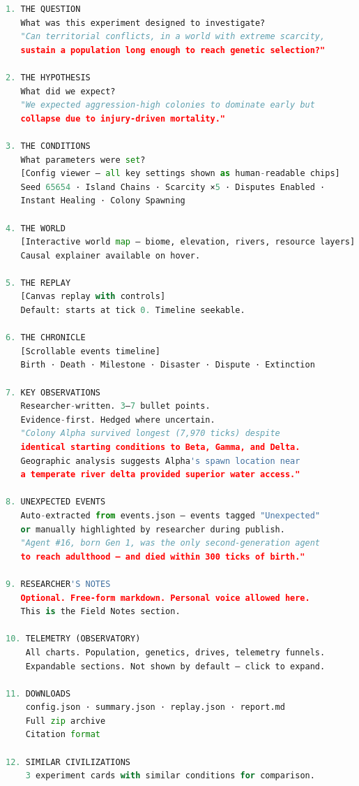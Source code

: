 \documentclass[11pt,a4paper]{article}
\begin{document}
\begin{lstlisting}[language=Python]
1. THE QUESTION
   What was this experiment designed to investigate?
   "Can territorial conflicts, in a world with extreme scarcity,
   sustain a population long enough to reach genetic selection?"

2. THE HYPOTHESIS
   What did we expect?
   "We expected aggression-high colonies to dominate early but
   collapse due to injury-driven mortality."

3. THE CONDITIONS
   What parameters were set?
   [Config viewer — all key settings shown as human-readable chips]
   Seed 65654 · Island Chains · Scarcity ×5 · Disputes Enabled ·
   Instant Healing · Colony Spawning

4. THE WORLD
   [Interactive world map — biome, elevation, rivers, resource layers]
   Causal explainer available on hover.

5. THE REPLAY
   [Canvas replay with controls]
   Default: starts at tick 0. Timeline seekable.

6. THE CHRONICLE
   [Scrollable events timeline]
   Birth · Death · Milestone · Disaster · Dispute · Extinction

7. KEY OBSERVATIONS
   Researcher-written. 3–7 bullet points.
   Evidence-first. Hedged where uncertain.
   "Colony Alpha survived longest (7,970 ticks) despite
   identical starting conditions to Beta, Gamma, and Delta.
   Geographic analysis suggests Alpha's spawn location near
   a temperate river delta provided superior water access."

8. UNEXPECTED EVENTS
   Auto-extracted from events.json — events tagged "Unexpected"
   or manually highlighted by researcher during publish.
   "Agent #16, born Gen 1, was the only second-generation agent
   to reach adulthood — and died within 300 ticks of birth."

9. RESEARCHER'S NOTES
   Optional. Free-form markdown. Personal voice allowed here.
   This is the Field Notes section.

10. TELEMETRY (OBSERVATORY)
    All charts. Population, genetics, drives, telemetry funnels.
    Expandable sections. Not shown by default — click to expand.

11. DOWNLOADS
    config.json · summary.json · replay.json · report.md
    Full zip archive
    Citation format

12. SIMILAR CIVILIZATIONS
    3 experiment cards with similar conditions for comparison.
\end{lstlisting}
\end{document}
